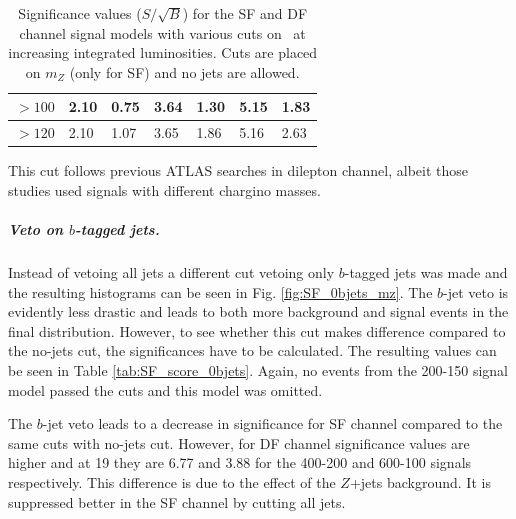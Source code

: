 \begin{table}[H]
\begin{tabular}{|l|llllll}
$>100$   & \multicolumn{1}{l|}{2.10}               & \multicolumn{1}{l|}{0.75}               & \multicolumn{1}{l|}{3.64}               & \multicolumn{1}{l|}{1.30}               & \multicolumn{1}{l|}{5.15}               & \multicolumn{1}{l|}{1.83}               \\ \hline
$>120$    & \multicolumn{1}{l|}{2.10}               & \multicolumn{1}{l|}{1.07}               & \multicolumn{1}{l|}{3.65}               & \multicolumn{1}{l|}{1.86}               & \multicolumn{1}{l|}{5.16}               & \multicolumn{1}{l|}{2.63}               \\ \hline
\end{tabular}
\caption{Significance values ($S/\sqrt{B}$) for the SF and DF channel signal models with various cuts on \mttwo \, at increasing integrated luminosities. Cuts are placed on $m_Z$ (only for SF) and no jets are allowed.}
\label{tab:SF_score}
\end{table}

This cut follows previous ATLAS searches in dilepton channel, albeit those studies used signals with different chargino masses. 


\subparagraph{Veto on $b$-tagged jets.}

Instead of vetoing all jets a different cut vetoing only $b$-tagged jets was made and the resulting histograms can be seen in Fig. \ref{fig:SF_0bjets_mz}. The $b$-jet veto is evidently less drastic and leads to both more background and signal events in the final distribution. However, to see whether this cut makes difference compared to the no-jets cut, the significances have to be calculated. The resulting values can be seen in Table \ref{tab:SF_score_0bjets}. Again, no events from the 200-150 signal model passed the cuts and this model was omitted.

The $b$-jet veto leads to a decrease in significance for SF channel compared to the same cuts with no-jets cut. However, for DF channel significance values are higher and at 19 \invfb they are 6.77 and 3.88 for the 400-200 and 600-100 signals respectively. This difference is due to the effect of the $Z$+jets background. It is suppressed better in the SF channel by cutting all jets. 

